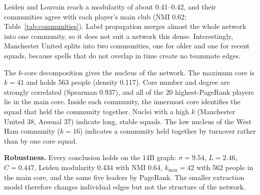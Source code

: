 \documentclass[11pt]{article}
\begin{document}
Leiden and Louvain reach a modularity of about 0.41--0.42, and their communities agree with each player's main club (NMI 0.62; Table~\ref{tab:communities}). Label propagation merges almost the whole network into one community, so it does not suit a network this dense. Interestingly, Manchester United splits into two communities, one for older and one for recent squads, because spells that do not overlap in time create no teammate edges.

The $k$-core decomposition \cite{seidman1983network} gives the nucleus of the network. The maximum core is $k=41$ and holds 563 people (density 0.117). Core number and degree are strongly correlated (Spearman 0.937), and all of the 20 highest-PageRank players lie in the main core. Inside each community, the innermost core identifies the squad that held the community together. Nuclei with a high $k$ (Manchester United 38, Arsenal 37) indicate long, stable squads. The low nucleus of the West Ham community ($k=16$) indicates a community held together by turnover rather than by one core squad.

\textbf{Robustness.} Every conclusion holds on the 14B graph: $\sigma=9.54$, $L=2.46$, $C=0.447$, Leiden modularity 0.434 with NMI 0.64, $k_{\max}=42$ with 562 people in the main core, and the same five leaders by PageRank. The smaller extraction model therefore changes individual edges but not the structure of the network.

\end{document}
